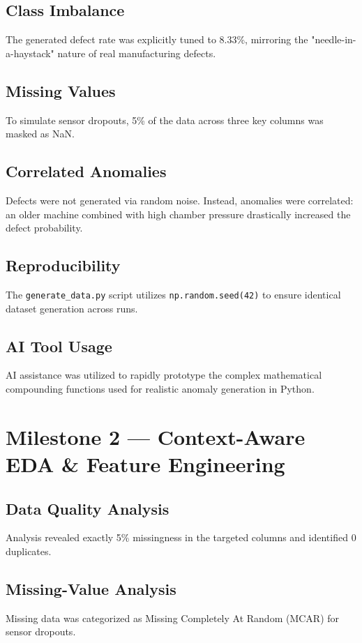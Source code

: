 \documentclass[12pt, a4paper]{article}
\begin{document}
\subsection{Class Imbalance}
The generated defect rate was explicitly tuned to 8.33\%, mirroring the "needle-in-a-haystack" nature of real manufacturing defects.

\subsection{Missing Values}
To simulate sensor dropouts, 5\% of the data across three key columns was masked as NaN.

\subsection{Correlated Anomalies}
Defects were not generated via random noise. Instead, anomalies were correlated: an older machine combined with high chamber pressure drastically increased the defect probability.

\subsection{Reproducibility}
The \texttt{generate\_data.py} script utilizes \texttt{np.random.seed(42)} to ensure identical dataset generation across runs.

\subsection{AI Tool Usage}
AI assistance was utilized to rapidly prototype the complex mathematical compounding functions used for realistic anomaly generation in Python.

\section{Milestone 2 — Context-Aware EDA \& Feature Engineering}
\subsection{Data Quality Analysis}
Analysis revealed exactly 5\% missingness in the targeted columns and identified 0 duplicates.

\subsection{Missing-Value Analysis}
Missing data was categorized as Missing Completely At Random (MCAR) for sensor dropouts.
\end{document}
